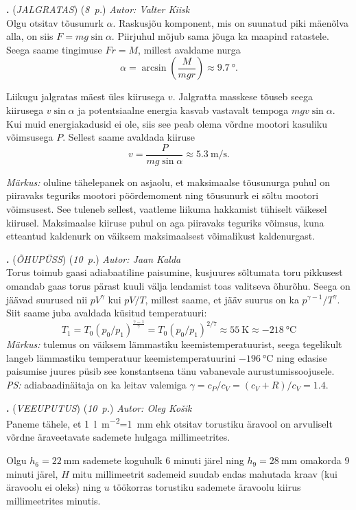 \documentclass[11pt,a5paper]{article}
\newcommand{\numb}[1]{\vspace{5pt}\textbf{\large #1}}
\newcommand{\nimi}[1]{(\textsl{\small #1})}
\newcommand{\punktid}[1]{(\emph{#1~p.})}
\newcounter{ylesanne}
\newcommand{\yl}[1]{\addtocounter{ylesanne}{1}\numb{\theylesanne.} \nimi{#1} \newblock{}}
\newcommand{\autor}[1]{\emph{Autor: #1}}%
\begin{document}
\yl{JALGRATAS} \punktid{8} \autor{Valter Kiisk}\\
\osa Olgu otsitav tõusunurk $\alpha$. Raskusjõu komponent, mis on suunatud piki mäenõlva alla, on siis $F=mg\sin\alpha$. Piirjuhul mõjub sama jõuga ka maapind ratastele. Seega saame tingimuse $Fr=M$, millest avaldame nurga
\[
\alpha=\arcsin\left( \frac{M}{mgr}\right)\approx \SI{9.7}{\degree}.
\]

\osa Liikugu jalgratas mäest üles kiirusega $v$. Jalgratta masskese tõuseb seega kiirusega $v\sin\alpha$ ja potentsiaalne energia kasvab vastavalt tempoga $mgv\sin\alpha$. Kui muid energiakadusid ei ole, siis see peab olema võrdne mootori kasuliku võimsusega $P$. Sellest saame avaldada kiiruse
\[
v=\frac{P}{mg\sin\alpha}\approx \SI{5.3}{\meter\per\second}.
\]

\textit{Märkus:} oluline tähelepanek on asjaolu, et maksimaalse tõusunurga puhul on piiravaks teguriks mootori pöördemoment ning tõusunurk ei sõltu mootori võimsusest. See tuleneb sellest, vaatleme liikuma hakkamist tühiselt väikesel kiirusel. Maksimaalse kiiruse puhul on aga piiravaks teguriks võimsus, kuna etteantud kaldenurk on väiksem maksimaalsest võimalikust kaldenurgast.


\yl{ÕHUPÜSS} \punktid{10} \autor{Jaan Kalda} \\
Torus toimub gaasi adiabaatiline paisumine, kusjuures sõltumata toru pikkusest omandab gaas torus pärast kuuli välja lendamist toas valitseva õhurõhu. Seega on jäävad suurused nii $pV^\gamma$ kui $pV/T$, millest saame, et jääv suurus on ka $p^{\gamma-1}/T^\gamma$. Siit saame juba avaldada küsitud temperatuuri:
$$
T_1=T_0(p_0/p_1)^{\frac{\gamma - 1}{\gamma}}=T_0(p_0/p_1)^{2/7} \approx \SI{55}{\kelvin} \approx \SI{-218}{\celsius}
$$
\textit{Märkus:} tulemus on väiksem lämmastiku keemistemperatuurist, seega tegelikult langeb lämmastiku temperatuur keemistemperatuurini $\SI{-196}{\celsius}$ ning edasise paisumise juures püsib see konstantsena tänu vabanevale aurustumissoojusele.
\textit{PS:} adiabaadinäitaja on ka leitav valemiga $\gamma=c_P/c_V=(c_V+R)/c_V=1.4$.

\yl{VEEUPUTUS} \punktid{10} \autor{Oleg Ko\v sik}\\
Paneme tähele, et \SI{1}{l\per m^2}=\SI{1}{mm} ehk otsitav torustiku äravool on arvuliselt võrdne äraveetavate sademete hulgaga millimeetrites.

Olgu $h_6=\SI{22}{\mm}$ sademete koguhulk 6 minuti järel ning $h_9=\SI{28}{\mm}$ omakorda 9 minuti järel, $H$ mitu millimeetrit sademeid suudab endas mahutada kraav (kui äravoolu ei oleks) ning $u$ töökorras torustiku sademete äravoolu kiirus millimeetrites minutis.
\end{document}
